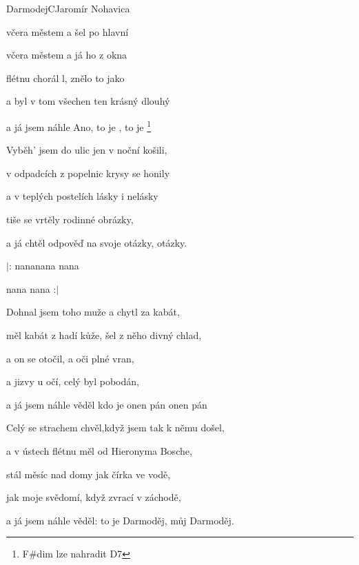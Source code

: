 \setcounter{page}{18}
\begin{song}{Darmodej}{C}{Jaromír Nohavica}
  \begin{SBVerse}
 včera městem  a šel po hlavní  

 včera městem  a já ho z okna 

 flétnu chorál l, znělo to jako 

a byl v tom všechen  ten krásný dlouhý 

a já jsem náhle  Ano, to je , to je 
\footnote{F\#dim lze nahradit D7}
  \end{SBVerse}
  \begin{SBVerse}
Vyběh' jsem do ulic jen v noční košili, 

v odpadcích z popelnic krysy se honily

a v teplých postelích lásky i nelásky 

tiše se vrtěly rodinné obrázky,

a já chtěl odpověď na svoje otázky, otázky.
  \end{SBVerse}
\begin{SBChorus}
$|$: nananana nana 

nana nana  :$|$
\end{SBChorus}
\begin{SBVerse}
Dohnal jsem toho muže a chytl za kabát,

měl kabát z hadí kůže, šel z něho divný chlad,

a on se otočil, a oči plné vran,

a jizvy u očí, celý byl pobodán,

a já jsem náhle věděl kdo je onen pán onen pán

  \end{SBVerse}
\begin{SBVerse}

Celý se strachem chvěl,když jsem tak k němu došel,

a v ústech flétnu měl od Hieronyma Bosche,

stál měsíc nad domy jak čírka ve vodě,

jak moje svědomí, když zvrací v záchodě,

a já jsem náhle věděl: to je Darmoděj, můj Darmoděj.


\end{SBVerse}
\end{song}
